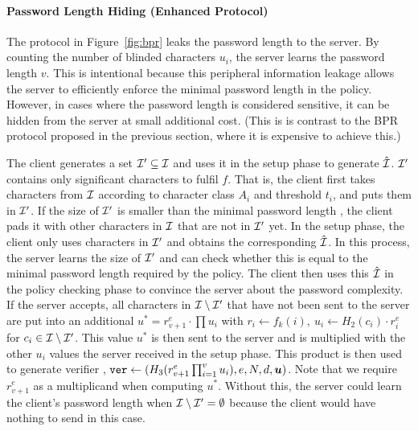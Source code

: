 \paragraph{Password Length Hiding (Enhanced Protocol)} 
The protocol in Figure~\ref{fig:bpr} leaks the password length to the server. By counting the number of blinded characters $u_i$, the server learns the password length $v$. 
This is intentional because this peripheral information leakage allows the server to efficiently enforce the minimal password length in the policy. 
However, in cases where the password length is considered sensitive, it can be hidden from the  server at small additional cost.
(This is is contrast to the \ac{BPR} protocol proposed in the previous section, where it is expensive to achieve this.)

The client generates a set $\mathcal{I}'\subseteq\mathcal{I}$ and uses it in the setup phase to generate $\hat{\mathcal{I}}$. 
$\mathcal{I}'$ contains only significant characters to fulfil $f$. 
That is, the client first takes characters from $\mathcal{I}$ according to character class $A_i$ and threshold $t_i$, and puts them in $\mathcal{I}'$.
If the size of $\mathcal{I}'$ is smaller than the minimal password length \pmin, the client pads it with other characters in $\mathcal{I}$ that are not in $\mathcal{I}'$ yet. 
In the setup phase, the client only uses characters in $\mathcal{I}'$ and obtains the corresponding $\hat{\mathcal{I}}$. In this process, the server learns the size of $\mathcal{I}'$ and can check whether this is equal to the minimal password length \pmin required by the policy. 
The client then uses this $\hat{\mathcal{I}}$ in the policy checking phase to convince the server about the password complexity. 
If the server accepts, all characters in $\mathcal{I}\setminus\mathcal{I}'$ that have not been sent to the server are put into an additional $u^\ast=r_{v+1}^e\cdot\prod u_i$ with $r_i\gets f_k(i),~ u_i\gets H_2(c_i)\cdot r_i^e$ for $c_i\in\mathcal{I}\setminus\mathcal{I}'$. 
This value $u^\ast$ is then sent to the server and is multiplied with the other $u_i$ values the server received in the setup phase.
This product is then used to generate verifier \ver, \ie $\mathtt{ver}\gets(H_3(r_{v+1}^e\prod_{i=1}^v u_i), e, N, d, \bm{u})$. 
Note that we require $r_{v+1}^e$ as a multiplicand when computing $u^\ast$. 
Without this, the server could learn the client's password length when $\mathcal{I}\setminus\mathcal{I}'=\emptyset$ because the client would have nothing to send in this case. 

